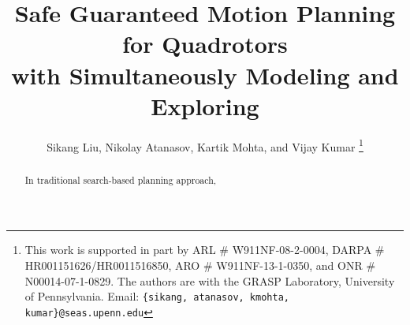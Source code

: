 \documentclass[letterpaper, 10 pt, conference]{bib/ieeeconf}
\title{\LARGE \bf
Safe Guaranteed Motion Planning for Quadrotors\\ with Simultaneously Modeling and Exploring
}
\author{Sikang Liu, Nikolay Atanasov, Kartik Mohta, and Vijay Kumar%
\thanks{This work is supported in part by ARL \# W911NF-08-2-0004, DARPA \# HR001151626/HR0011516850, ARO \# W911NF-13-1-0350, and ONR \# N00014-07-1-0829. The authors are with the GRASP Laboratory, University of Pennsylvania. Email: \texttt{\{sikang, atanasov, kmohta, kumar\}@seas.upenn.edu}}
}
\let\appendices\relax
\begin{document}
\maketitle
\begin{abstract}
In traditional search-based planning approach, 

\end{abstract}


%
%
%
%
%

%
%
%
%
%

%
%


\end{document}
